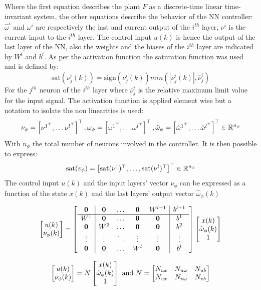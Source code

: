 \documentclass{article}
\begin{document}
Where the first equation describes the plant $F$ as a discrete-time linear time-invariant system, the other equations describe the behavior of the NN controller: $\hat{\omega}^{i}$ and $\omega^{i}$ are respectively the last and current output of the $i^{th}$ layer, $\nu^{i}$ is the current input to the $i^{th}$ layer. The control input $u(k)$ is hence the output of the last layer of the NN, also the weights and the biases of the $i^{th}$ layer are indicated by $W^{i}$ and $b^{i}$. As per the activation function the saturation function was used and is defined by:
$$
   \text{sat}(\nu^{i}_{j}(k)) = \text{sign}(\nu^{i}_{j}(k)) min(|\nu^{i}_{j}(k)|, \bar{\nu}^{i}_{j})
$$  
For the $j^{th}$ neuron of the $i^{th}$ layer where $\bar{\nu}^{i}_{j}$ is the relative maximum limit value for the input signal. The activation function is applied element wise but a notation to isolate the non linearities is used:
$$
    \nu_{\phi} = \left[\begin{matrix}\nu^{1^\top}, \dots \nu^{l^\top}\end{matrix}\right]^\top, \omega_{\phi} = \left[\begin{matrix}\omega^{1^\top}, \dots \omega^{l^\top}\end{matrix}\right]^\top, \hat{\omega}_{\phi} = \left[\begin{matrix}\hat{\omega}^{1^\top}, \dots \hat{\omega}^{l^\top}\end{matrix}\right]^\top \in {\mathbb{R}}^{n_{\phi}}
$$
With $n_{\phi}$ the total number of neurons involved in the controller. It is then possible to express:
$$
    \text{sat}(v_{\phi}) = \left[\begin{matrix}\text{sat}(\nu^{1})^\top, \dots, \text{sat}(\nu^{l})^\top\end{matrix}\right]^\top \in {\mathbb{R}}^{n_{\phi}}
$$
The control input $u(k)$ and the input layers' vector $\nu_{\phi}$ can be expressed as a function of the state $x(k)$ and the last layers' output vector $\hat{\omega}_{\phi}(k)$

\begin{equation}
    \left[\begin{matrix}u(k)\\ \nu_{\phi}(k)\end{matrix}\right] = \left[\begin{matrix}\begin{array}{c|cccc|c} 
        \operatorname{\mathbf{0}} & \operatorname{\mathbf{0}} & \dots & \operatorname{\mathbf{0}} & W^{l+1} & b^{l+1}\\
        \hline
        W^{1} & \operatorname{\mathbf{0}} & \dots & \operatorname{\mathbf{0}} & \operatorname{\mathbf{0}} & b^{1}\\
        \operatorname{\mathbf{0}} & W^{2} & \dots & \operatorname{\mathbf{0}} & \operatorname{\mathbf{0}} & b^{2}\\
        \vdots & \vdots & \ddots & \vdots & \vdots & \vdots\\
        \operatorname{\mathbf{0}} & \operatorname{\mathbf{0}} & \dots & W^{l} & \operatorname{\mathbf{0}} & b^{l}
    \end{array}\end{matrix}\right]  \left[\begin{matrix}x(k) \\ \hat{\omega}_{\phi}(k) \\ 1\end{matrix}\right]
\end{equation}

$$
    \left[\begin{matrix}u(k)\\ \nu_{\phi}(k)\end{matrix}\right] = N  \left[\begin{matrix}x(k) \\ \hat{\omega}_{\phi}(k) \\ 1\end{matrix}\right]\text{ and } N = \left[\begin{matrix}N_{ux} & N_{u \omega} & N_{ub} \\ N_{vx} & N_{v \omega} & N_{vb}\end{matrix}\right]
$$
\end{document}
